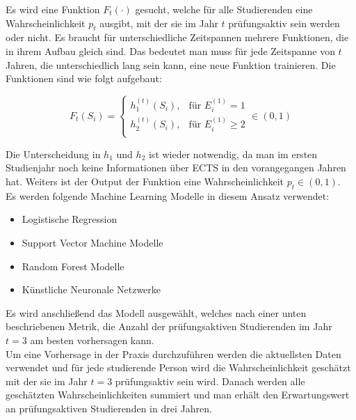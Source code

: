 Es wird eine Funktion $F_t(\cdot)$ gesucht, welche f\"ur alle Studierenden eine Wahrscheinlichkeit $p_t$ ausgibt, mit der 
sie im Jahr $t$ pr\"ufungsaktiv sein werden oder nicht. Es braucht f\"ur unterschiedliche Zeitspannen mehrere Funktionen, die in ihrem Aufbau gleich sind. 
Das bedeutet man muss f\"ur jede Zeitspanne von $t$ Jahren, die unterschiedlich lang sein kann, eine neue Funktion trainieren.
Die Funktionen sind wie folgt aufgebaut:

$$
    F_t(S_i)=
    \left\{
    \begin{array}{lr}
      h_1^{(t)}(S_i),& \text{für }E_i^{(1)} = 1 \\
      h_2^{(t)}(S_i),& \text{für }E_i^{(1)} \geq 2 \\ 
    \end{array}
    \right.
    \in (0,1)
$$

Die Unterscheidung in $h_1$ und $h_2$ ist wieder notwendig, da man im ersten Studienjahr noch keine Informationen \"uber ECTS in den vorangegangen Jahren hat. 
Weiters ist der Output der Funktion eine Wahrscheinlichkeit $p_t \in (0,1)$. \\

Es werden folgende Machine Learning Modelle in diesem Ansatz verwendet:
\begin{itemize}
  \item Logistische Regression
  \item Support Vector Machine Modelle
  \item Random Forest Modelle
  \item K\"unstliche Neuronale Netzwerke
\end{itemize}

Es wird anschlie{\ss}end das Modell ausgew\"ahlt, welches nach einer unten beschriebenen Metrik, die Anzahl der pr\"ufungsaktiven Studierenden 
im Jahr $t = 3$ am besten vorhersagen kann. \\

Um eine Vorhersage in der Praxis durchzuf\"uhren werden die aktuellsten Daten verwendet und f\"ur jede studierende Person wird die 
Wahrscheinlichkeit gesch\"atzt mit der sie im Jahr $t=3$ pr\"ufungsaktiv sein wird. Danach werden alle gesch\"atzten Wahrscheinlichkeiten summiert und 
man erh\"alt den Erwartungswert an pr\"ufungsaktiven Studierenden in drei Jahren.




